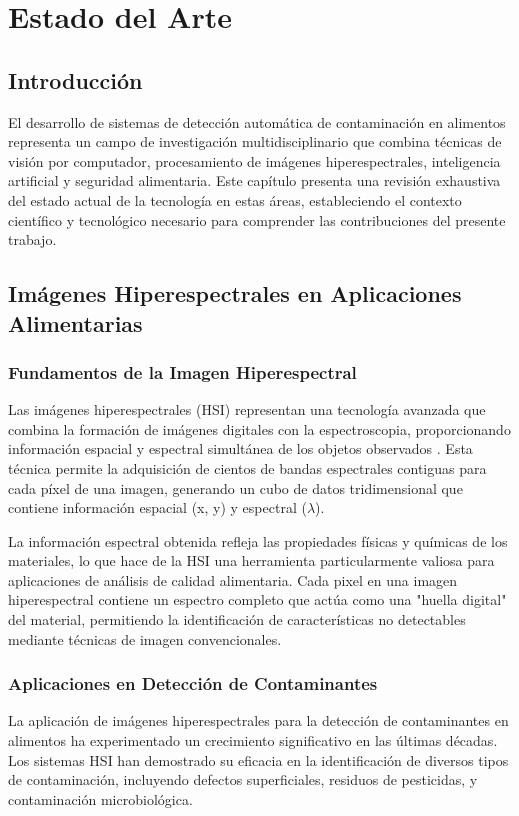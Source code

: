 \chapter{Estado del Arte}

\section{Introducción}
El desarrollo de sistemas de detección automática de contaminación en alimentos representa un campo de investigación multidisciplinario que combina técnicas de visión por computador, procesamiento de imágenes hiperespectrales, inteligencia artificial y seguridad alimentaria. Este capítulo presenta una revisión exhaustiva del estado actual de la tecnología en estas áreas, estableciendo el contexto científico y tecnológico necesario para comprender las contribuciones del presente trabajo.

\section{Imágenes Hiperespectrales en Aplicaciones Alimentarias}

\subsection{Fundamentos de la Imagen Hiperespectral}
Las imágenes hiperespectrales (HSI) representan una tecnología avanzada que combina la formación de imágenes digitales con la espectroscopia, proporcionando información espacial y espectral simultánea de los objetos observados \cite{lu2020medical,zhang2016hyperspectral}. Esta técnica permite la adquisición de cientos de bandas espectrales contiguas para cada píxel de una imagen, generando un cubo de datos tridimensional que contiene información espacial (x, y) y espectral ($\lambda$).

La información espectral obtenida refleja las propiedades físicas y químicas de los materiales, lo que hace de la HSI una herramienta particularmente valiosa para aplicaciones de análisis de calidad alimentaria. Cada pixel en una imagen hiperespectral contiene un espectro completo que actúa como una "huella digital" del material, permitiendo la identificación de características no detectables mediante técnicas de imagen convencionales.

\subsection{Aplicaciones en Detección de Contaminantes}
La aplicación de imágenes hiperespectrales para la detección de contaminantes en alimentos ha experimentado un crecimiento significativo en las últimas décadas. Los sistemas HSI han demostrado su eficacia en la identificación de diversos tipos de contaminación, incluyendo defectos superficiales, residuos de pesticidas, y contaminación microbiológica.

